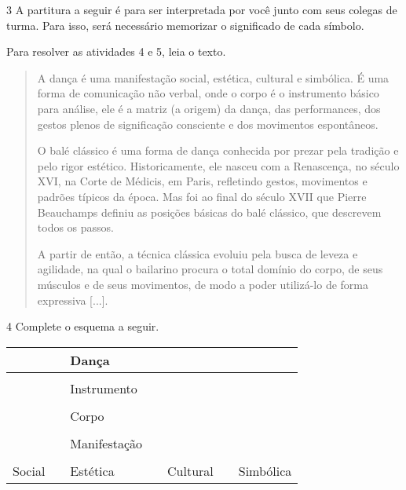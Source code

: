 \num{3}  A partitura a seguir é para ser interpretada por você junto com seus
  colegas de turma. Para isso, será necessário memorizar o significado
  de cada símbolo.



Para resolver as atividades 4 e 5, leia o texto.

\begin{quote}
A dança é uma manifestação social, estética, cultural e simbólica. É uma
forma de comunicação não verbal, onde o corpo é o instrumento básico
para análise, ele é a matriz (a origem) da dança, das performances, dos
gestos plenos de significação consciente e dos movimentos espontâneos.

O balé clássico é uma forma de dança conhecida por prezar pela tradição
e pelo rigor estético. Historicamente, ele nasceu com a Renascença, no século XVI, na
Corte de Médicis, em Paris, refletindo gestos, movimentos e padrões
típicos da época. Mas foi ao final do século XVII que Pierre Beauchamps
definiu as posições básicas do balé clássico, que descrevem todos os
passos.

A partir de então, a técnica clássica
evoluiu pela busca de leveza e agilidade, na qual o
bailarino procura o total domínio do corpo, de seus músculos e de seus
movimentos, de modo a poder utilizá-lo de forma expressiva {[}...{]}.

\end{quote}

\num{4}  Complete o esquema a seguir.


\begin{longtable}[]{@{}lllllll@{}}
\toprule
& & \textbf{Dança} & & &\tabularnewline
\midrule
\endhead
& & & & & &\tabularnewline
& & Instrumento & & &\tabularnewline
& & & & & &\tabularnewline
& & Corpo & & &\tabularnewline
& & & & & &\tabularnewline
& & Manifestação & &\tabularnewline
& & & & & &\tabularnewline
Social & & Estética & & Cultural & & Simbólica\tabularnewline
\bottomrule
\end{longtable}


